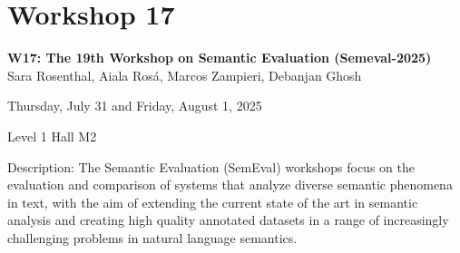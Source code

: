 \clearpage



\section[W17: The 19th Workshop on Semantic Evaluation (Semeval-2025)]{Workshop 17}
\label{workshop_17_1}
\label{workshop_17_2}

\begin{center}
    {\Large \textbf{W17: The 19th Workshop on Semantic Evaluation (Semeval-2025)}}\\

   Sara Rosenthal, Aiala Rosá, Marcos Zampieri, Debanjan Ghosh
    
    Thursday, July 31 and Friday, August 1, 2025
    
    Level 1 Hall M2

\end{center}

Description: The Semantic Evaluation (SemEval) workshops focus on the evaluation and comparison of systems that
analyze diverse semantic phenomena in text, with the aim of extending the current state of the art in
semantic analysis and creating high quality annotated datasets in a range of increasingly challenging
problems in natural language semantics.

